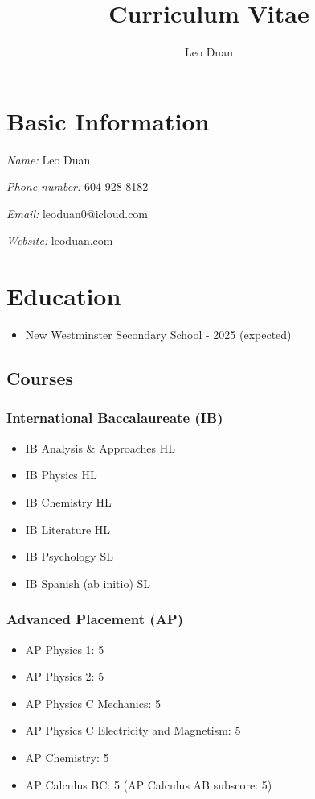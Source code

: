 \documentclass{article}
\title{\textbf{Curriculum Vitae}}
\author{Leo Duan}
\date{}
\begin{document}
\maketitle

\section*{Basic Information}

\textit{Name:} Leo Duan

\textit{Phone number:} 604-928-8182

\textit{Email:} leoduan0@icloud.com

\textit{Website:} leoduan.com

\section*{Education}

\begin{itemize}
    \item New Westminster Secondary School - 2025 (expected)
\end{itemize}

\subsection*{Courses}

\subsubsection*{International Baccalaureate (IB)}

\begin{itemize}
    \item IB Analysis \& Approaches HL
    \item IB Physics HL
    \item IB Chemistry HL
    \item IB Literature HL
    \item IB Psychology SL
    \item IB Spanish (ab initio) SL
\end{itemize}

\subsubsection*{Advanced Placement (AP)}

\begin{itemize}
    \item AP Physics 1: 5
    \item AP Physics 2: 5
    \item AP Physics C Mechanics: 5
    \item AP Physics C Electricity and Magnetism: 5
    \item AP Chemistry: 5
    \item AP Calculus BC: 5 (AP Calculus AB subscore: 5)
\end{itemize}
\end{document}

